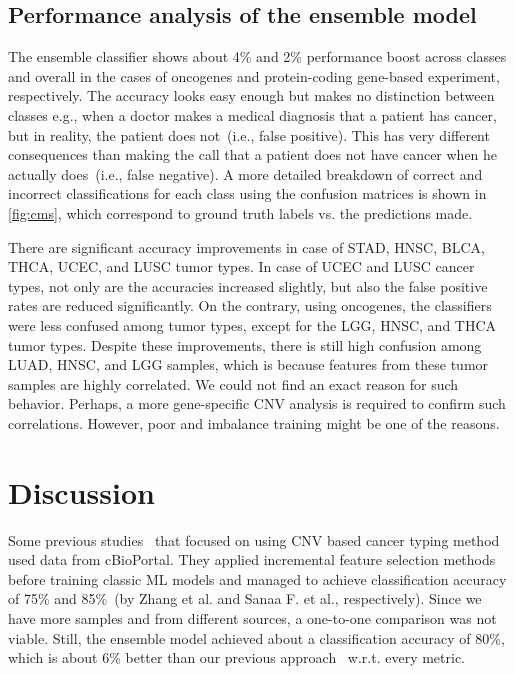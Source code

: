 \subsection{Performance analysis of the ensemble model}
The ensemble classifier shows about 4\% and 2\% performance boost across classes and overall in the cases of oncogenes and protein-coding gene-based experiment, respectively. The accuracy looks easy enough but makes no distinction between classes e.g., when a doctor makes a medical diagnosis that a patient has cancer, but in reality, the patient does not~(i.e., false positive). This has very different consequences than making the call that a patient does not have cancer when he actually does~(i.e., false negative). A more detailed breakdown of correct and incorrect classifications for each class using the confusion matrices is shown in \cref{fig:cms}, which correspond to ground truth labels vs. the predictions made.

\hspace*{3.5mm} There are significant accuracy improvements in case of STAD, HNSC, BLCA, THCA, UCEC, and LUSC tumor types. In case of UCEC and LUSC cancer types, not only are the accuracies increased slightly, but also the false positive rates are reduced significantly. On the contrary, using oncogenes, the classifiers were less confused among tumor types, except for the LGG, HNSC, and THCA tumor types. Despite these improvements, there is still high confusion among LUAD, HNSC, and LGG samples, which is because features from these tumor samples are highly correlated. We could not find an exact reason for such behavior. Perhaps, a more gene-specific CNV analysis is required to confirm such correlations. However, poor and imbalance training might be one of the reasons. 

\section{Discussion}\label{chapter_3:discussion}
Some previous studies~\cite{zhang2016classification,elsadek2018supervised} that focused on using CNV based cancer typing method used data from cBioPortal. They applied incremental feature selection methods before training classic ML models and managed to achieve classification accuracy of 75\% and 85\%~(by Zhang et al. and Sanaa F. et al., respectively). Since we have more samples and from different sources, a one-to-one comparison was not viable. Still, the ensemble model achieved about a classification accuracy of 80\%, which is about 6\% better than our previous approach~\cite{karim2018a2ic} w.r.t. every metric. 

